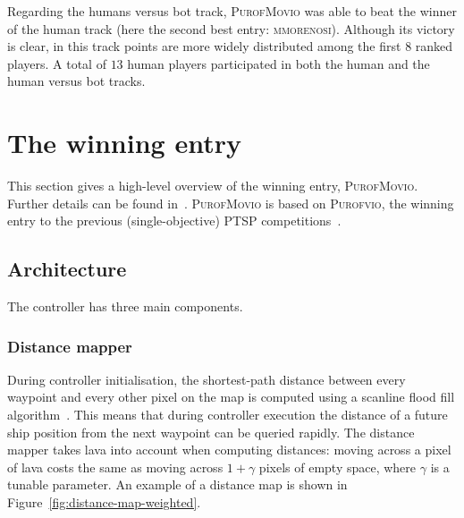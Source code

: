\documentclass[conference]{IEEEtran}
\begin{document}
Regarding the humans versus bot track, \textsc{PurofMovio} was able to beat the winner of the human track (here the second best entry: \textsc{mmorenosi}). Although its victory is clear, in this track points are more widely distributed among the first $8$ ranked players. A total of $13$ human players participated in both the human and the human versus bot tracks.

\section{The winning entry} \label{sec:purofmovio}

This section gives a high-level overview of the winning entry, \textsc{PurofMovio}.
Further details can be found in~\cite{Powley2013_moptsp}.
\textsc{PurofMovio} is based on \textsc{Purofvio}, the winning entry to the previous (single-objective) PTSP competitions~\cite{Powley2012,Perez2013}.

\subsection{Architecture}

The controller has three main components.

\subsubsection{Distance mapper}
During controller initialisation, the shortest-path distance between every waypoint and every other pixel on the map is computed
using a scanline flood fill algorithm~\cite{Lieberman1978}.
This means that during controller execution
the distance of a future ship position from the next waypoint can be queried rapidly.
The distance mapper takes lava into account when computing distances:
moving across a pixel of lava costs the same as moving across $1+\gamma$ pixels of empty space,
where $\gamma$ is a tunable parameter.
An example of a distance map is shown in Figure~\ref{fig:distance-map-weighted}.
\end{document}
